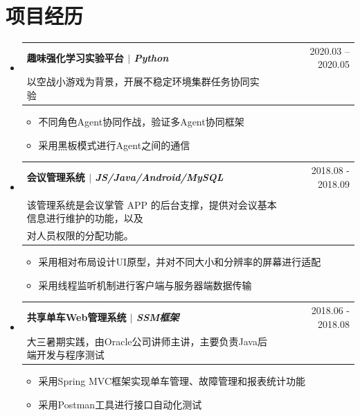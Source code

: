 \documentclass[a4paper,11pt]{ctexart}
\makeatletter
\newcommand{\CVItem}[1]{
	\item\small{
		{#1 \vspace{-2pt}}
	}
}
\newcommand{\CVSubheading}[4]{
	\vspace{-2pt}\item
	\begin{tabular*}{0.97\textwidth}[t]{l@{\extracolsep{\fill}}r}
		\textbf{#1} & #2 \\
		\small#3 & \small #4 \\
	\end{tabular*}\vspace{-7pt}
}
\newcommand{\CVSubHeadingListStart}{\begin{itemize}[leftmargin=0.5cm, label={}]}
\newcommand{\CVSubHeadingListEnd}{\end{itemize}}
\newcommand{\CVItemListStart}{\begin{itemize}}
\newcommand{\CVItemListEnd}{\end{itemize}\vspace{-5pt}}
\makeatother
\begin{document}
	\section{项目经历}
	\CVSubHeadingListStart
	\CVSubheading
	{{趣味强化学习实验平台}  $|$ \emph{\small{Python}}}{2020.03 -- 2020.05}
	{以空战小游戏为背景，开展不稳定环境集群任务协同实验}{}
	\CVItemListStart
	\CVItem{不同角色Agent协同作战，验证多Agent协同框架}
	\CVItem{采用黑板模式进行Agent之间的通信}
	\CVItemListEnd
	\CVSubheading
	{{会议管理系统}  $|$ \emph{\small{JS/Java/Android/MySQL}}}{2018.08 - 2018.09}
	{\makecell[l]{\hspace{2em}2018年(第6届)中国大学生计算机设计大赛软件服务外包竞赛（移动终端应用）。\\
			该管理系统是会议掌管 APP 的后台支撑，提供对会议基本信息进行维护的功能，以及\\
			对人员权限的分配功能。
	}}{}
	\CVItemListStart
	\CVItem{采用相对布局设计UI原型，并对不同大小和分辨率的屏幕进行适配}
	\CVItem{采用线程监听机制进行客户端与服务器端数据传输}
	\CVItemListEnd
	\CVSubheading
	{{共享单车Web管理系统}  $|$ \emph{\small{SSM框架}}}{2018.06 - 2018.08}
	{大三暑期实践，由Oracle公司讲师主讲，主要负责Java后端开发与程序测试}{}
	\CVItemListStart
	\CVItem{采用Spring MVC框架实现单车管理、故障管理和报表统计功能}
	\CVItem{采用Postman工具进行接口自动化测试}
	\CVItemListEnd
	
	\CVSubHeadingListEnd
	

	
\end{document}
